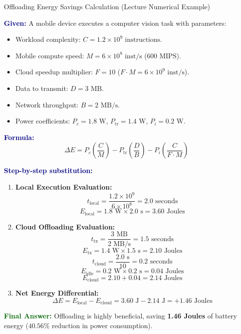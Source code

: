 \documentclass[11pt,a4paper,openany]{report}
\newcommand{\Given}{\par\textbf{\textcolor{navy}{Given:}} }
\newcommand{\Formula}{\par\textbf{\textcolor{navy}{Formula:}} }
\newcommand{\Steps}{\par\textbf{\textcolor{navy}{Step-by-step substitution:}}\par}
\newcommand{\Answer}{\par\textbf{\textcolor{darkgreen}{Final Answer:}} }
\begin{document}
\begin{solved}{Offloading Energy Savings Calculation (Lecture Numerical Example)}
\Given A mobile device executes a computer vision task with parameters:
\begin{itemize}
  \item Workload complexity: $C = 1.2 \times 10^9\text{ instructions}$.
  \item Mobile compute speed: $M = 6 \times 10^8\text{ inst/s}$ ($600\text{ MIPS}$).
  \item Cloud speedup multiplier: $F = 10$ ($F \cdot M = 6 \times 10^9\text{ inst/s}$).
  \item Data to transmit: $D = 3\text{ MB}$.
  \item Network throughput: $B = 2\text{ MB/s}$.
  \item Power coefficients: $P_c = 1.8\text{ W}$, $P_{\text{tr}} = 1.4\text{ W}$, $P_i = 0.2\text{ W}$.
\end{itemize}
\Formula
\begin{equation}
\Delta E = P_c \left(\frac{C}{M}\right) - P_{\text{tr}} \left(\frac{D}{B}\right) - P_i \left(\frac{C}{F \cdot M}\right)
\end{equation}
\Steps
\begin{enumerate}[leftmargin=*]
  \item \textbf{Local Execution Evaluation:}
  \begin{equation}
  t_{\text{local}} = \frac{1.2 \times 10^9}{6 \times 10^8} = 2.0\text{ seconds}
  \end{equation}
  \begin{equation}
  E_{\text{local}} = 1.8\text{ W} \times 2.0\text{ s} = 3.60\text{ Joules}
  \end{equation}
  \item \textbf{Cloud Offloading Evaluation:}
  \begin{equation}
  t_{\text{tx}} = \frac{3\text{ MB}}{2\text{ MB/s}} = 1.5\text{ seconds}
  \end{equation}
  \begin{equation}
  E_{\text{tx}} = 1.4\text{ W} \times 1.5\text{ s} = 2.10\text{ Joules}
  \end{equation}
  \begin{equation}
  t_{\text{cloud}} = \frac{2.0\text{ s}}{10} = 0.2\text{ seconds}
  \end{equation}
  \begin{equation}
  E_{\text{idle}} = 0.2\text{ W} \times 0.2\text{ s} = 0.04\text{ Joules}
  \end{equation}
  \begin{equation}
  E_{\text{cloud}} = 2.10 + 0.04 = 2.14\text{ Joules}
  \end{equation}
  \item \textbf{Net Energy Differential:}
  \begin{equation}
  \Delta E = E_{\text{local}} - E_{\text{cloud}} = 3.60\text{ J} - 2.14\text{ J} = +1.46\text{ Joules}
  \end{equation}
\end{enumerate}
\Answer Offloading is highly beneficial, saving \textbf{1.46 Joules} of battery energy ($40.56\%$ reduction in power consumption).
\end{solved}
\end{document}

